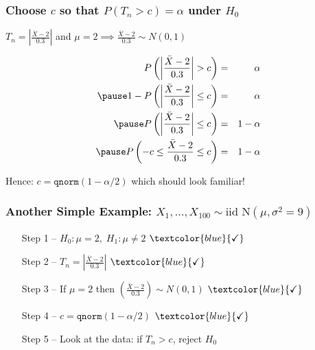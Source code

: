 \begin{frame}
  \frametitle{Choose $c$ so that $P(T_n >c) = \alpha$ under $H_0$}
  $T_n = \displaystyle \left|\frac{\bar{X}-2}{0.3}\right|$ and $\mu=2 \implies \displaystyle \frac{\bar{X}-2}{0.3} \sim N(0,1)$ \pause

  \begin{eqnarray*}
    P\left( \left|\frac{\bar{X}-2}{0.3}\right| > c \right) &=& \alpha\\ \pause
    1 - P\left( \left|\frac{\bar{X}-2}{0.3}\right| \leq c \right) &=& \alpha\\ \pause
    P\left( \left|\frac{\bar{X}-2}{0.3}\right| \leq c \right) &=& 1 - \alpha\\ \pause
    P\left(-c \leq \frac{\bar{X}-2}{0.3} \leq c \right) &=& 1 - \alpha
  \end{eqnarray*}

  \alert{Hence: $c = \texttt{qnorm}(1 - \alpha/2)$ which should look familiar!}
\end{frame}
\begin{frame}
  \frametitle{Another Simple Example: $X_1, \dots, X_{100}\sim \mbox{iid N}(\mu, \sigma^2 = 9)$}
  \begin{enumerate}
    \item[Step 1] -- $H_0\colon \mu = 2, \; H_1\colon \mu \neq 2$ $\textcolor{blue}{\checkmark}$
    \item[Step 2] -- $T_n = \displaystyle \left|\frac{\bar{X} - 2}{0.3} \right|$ $\textcolor{blue}{\checkmark}$
    \item[Step 3] -- If $\mu = 2$ then $\displaystyle \left(\frac{\bar{X} - 2}{0.3}\right) \sim N(0,1)$ $\textcolor{blue}{\checkmark}$
    \item[Step 4] -- $c = \texttt{qnorm}(1 - \alpha /2)$ $ \textcolor{blue}{\checkmark}$
    \item[Step 5] -- \alert{Look at the data: if $T_n >c$, reject $H_0$}
  \end{enumerate}
\end{frame}

